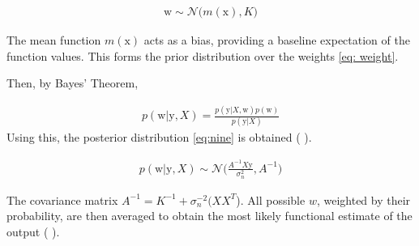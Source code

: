\documentclass[11pt,a4paper]{article}
\newcommand{\citeboth}[1]{\citeauthor{#1} \citep{#1}}
\begin{document}
\begin{align}
    \boldsymbol{\mathrm{w}} \sim \mathcal{N}\bigl(m(\boldsymbol{\mathrm{x}}), K\bigr) \label{eq: weight}
\end{align}


The mean function $m(\boldsymbol{\mathrm{x}})$ acts as a bias, 
providing a baseline expectation of the function values. 
This forms the prior distribution over the weights \eqref{eq: weight}.

Then, by Bayes' Theorem, 
  
\begin{align}
    p(\boldsymbol{\mathrm{w}}|\boldsymbol{\mathrm{y}}, X) = \frac{p(\boldsymbol{\mathrm{y}}|X,\boldsymbol{\mathrm{w}}) p(\boldsymbol{\mathrm{w}})}{p(\boldsymbol{\mathrm{y}}|X)} \label{eq: post}
\end{align}
Using this, the posterior distribution \eqref{eq:nine} is obtained (\citeboth{rasmussen2006}).

\begin{align}
    p(\boldsymbol{\mathrm{w}}|\boldsymbol{\mathrm{y}}, X) \sim \mathcal{N}\bigl(\frac{A^{-1}X\boldsymbol{\mathrm{y}}}{\sigma_{n}^{2}}, A^{-1}\bigr) \label{eq:nine}
\end{align}

The covariance matrix $A^{-1} = K^{-1} + \sigma_{n}^{-2}(XX^T$).
All possible $w$, weighted by their probability, are then averaged to obtain the
most likely functional estimate of the output (\citeboth{rasmussen2006}).



\end{document}
